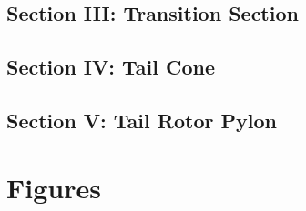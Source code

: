 \documentclass[letterpaper,11pt,openany,oneside]{book}
\begin{document}
\section{Section III: Transition Section}

\clearpage
\section{Section IV: Tail Cone}

\clearpage
\section{Section V: Tail Rotor Pylon}


\renewcommand{\thefigure}{\arabic{figure}}
\setcounter{figure}{0}
\captionsetup{format=hang,labelformat=default,labelsep=endash}
\chapter{Figures}

\end{document}
